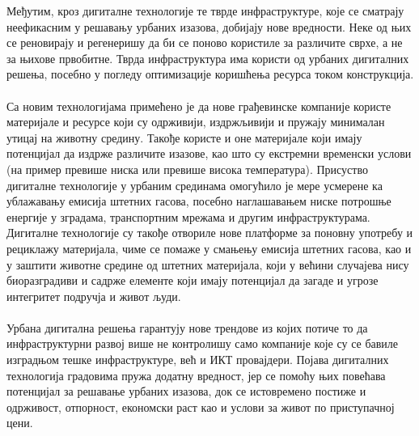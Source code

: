 \documentclass{article}
\begin{document}
Међутим, кроз дигиталне технологије те тврде инфраструктуре, које се сматрају неефикасним у решавању урбаних изазова, добијају нове вредности. Неке од њих се реновирају и регенеришу да би се поново користиле за различите сврхе, а не за њихове првобитне. Тврда инфраструктура има користи од урбаних дигиталних решења, посебно у погледу оптимизације коришћења ресурса током конструкција. \\\\
Са новим технологијама примећено је да нове грађевинске компаније користе материјале и ресурсе који су одрживији, издржљивији и пружају минималан утицај на животну средину. Такође користе и оне материјале који имају потенцијал да издрже различите изазове, као што су екстремни временски услови (на пример превише ниска или превише висока температура). Присуство дигиталне технологије у урбаним срединама омогућило је мере усмерене ка ублажавању емисија штетних гасова, посебно наглашавањем ниске потрошње енергије у зградама, транспортним мрежама и другим инфраструктурама. Дигиталне технологије су такође отвориле нове платформе за поновну употребу и рециклажу материјала, чиме се помаже у смањењу емисија штетних гасова, као и у заштити животне средине од штетних материјала, који у већини случајева нису биоразградиви и садрже елементе који имају потенцијал да загаде и угрозе интегритет подручја и живот људи. \\\\
Урбана дигитална решења гарантују нове трендове из којих потиче то да инфраструктурни развој више не контролишу само компаније које су се бавиле изградњом тешке инфраструктуре, већ и ИКТ провајдери. Појава дигиталних технологија градовима пружа додатну вредност, јер се помоћу њих повећава потенцијал за решавање урбаних изазова, док се истовремено постиже и одрживост, отпорност, економски раст као и услови за живот по приступачној цени. 
\end{document}
